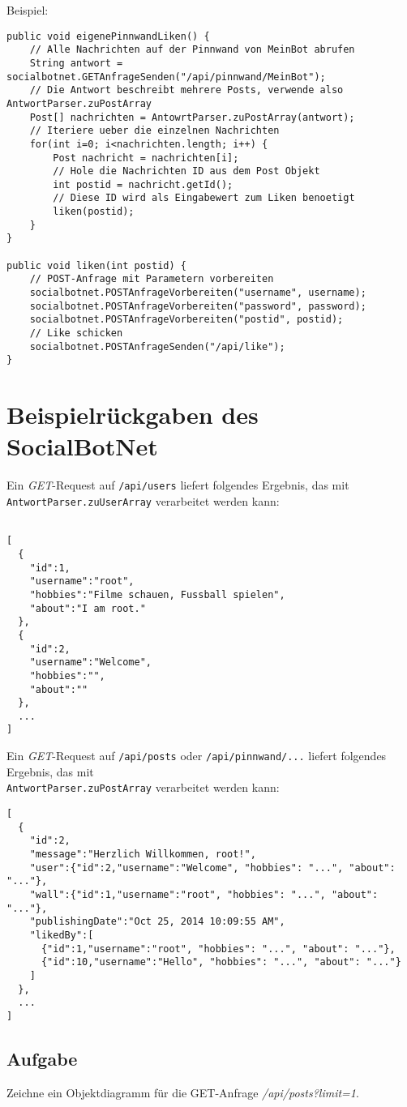 \documentclass[parskip=half*]{scrartcl}
\begin{document}
Beispiel:
\begin{lstlisting}
public void eigenePinnwandLiken() {
    // Alle Nachrichten auf der Pinnwand von MeinBot abrufen
    String antwort = socialbotnet.GETAnfrageSenden("/api/pinnwand/MeinBot");
    // Die Antwort beschreibt mehrere Posts, verwende also AntwortParser.zuPostArray
    Post[] nachrichten = AntowrtParser.zuPostArray(antwort);
    // Iteriere ueber die einzelnen Nachrichten
    for(int i=0; i<nachrichten.length; i++) {
        Post nachricht = nachrichten[i];
        // Hole die Nachrichten ID aus dem Post Objekt
        int postid = nachricht.getId();
        // Diese ID wird als Eingabewert zum Liken benoetigt
        liken(postid);
    }
}

public void liken(int postid) {
    // POST-Anfrage mit Parametern vorbereiten
    socialbotnet.POSTAnfrageVorbereiten("username", username);
    socialbotnet.POSTAnfrageVorbereiten("password", password);
    socialbotnet.POSTAnfrageVorbereiten("postid", postid);
    // Like schicken
    socialbotnet.POSTAnfrageSenden("/api/like");
}
\end{lstlisting}

\newpage
\section*{Beispielrückgaben des SocialBotNet}

Ein \emph{GET}-Request auf \lstinline{/api/users} liefert folgendes Ergebnis, das mit \lstinline{AntwortParser.zuUserArray} verarbeitet werden kann:
\begin{lstlisting}

[
  {
    "id":1,
    "username":"root",
    "hobbies":"Filme schauen, Fussball spielen",
    "about":"I am root."
  },
  {
    "id":2,
    "username":"Welcome",
    "hobbies":"",
    "about":""
  },
  ...
]
\end{lstlisting}


Ein \emph{GET}-Request auf \lstinline{/api/posts} oder \lstinline{/api/pinnwand/...} liefert folgendes Ergebnis, das mit \\\lstinline{AntwortParser.zuPostArray} verarbeitet werden kann:
\begin{lstlisting}
[
  {
    "id":2,
    "message":"Herzlich Willkommen, root!",
    "user":{"id":2,"username":"Welcome", "hobbies": "...", "about": "..."},
    "wall":{"id":1,"username":"root", "hobbies": "...", "about": "..."},
    "publishingDate":"Oct 25, 2014 10:09:55 AM",
    "likedBy":[
      {"id":1,"username":"root", "hobbies": "...", "about": "..."},
      {"id":10,"username":"Hello", "hobbies": "...", "about": "..."}
    ]
  },
  ...
]
\end{lstlisting}

\subsection*{Aufgabe} Zeichne ein Objektdiagramm für die GET-Anfrage \emph{/api/posts?limit=1}.
\end{document}

